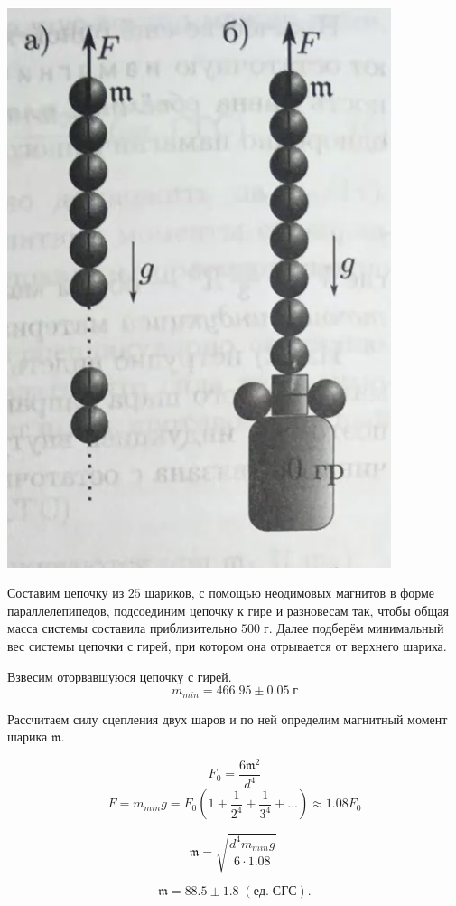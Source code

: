 \begin{center}
\begin{minipage}{0.4\textwidth}
\end{minipage}
\begin{minipage}{0.05\textwidth}
\
\end{minipage}
\begin{minipage}{0.4\textwidth}
\begin{center}
\includegraphics[width=0.7\linewidth]{2.jpg}\\
\end{center}
Составим цепочку из $25$ шариков, с помощью неодимовых магнитов в форме параллелепипедов, подсоединим цепочку к гире и разновесам так, чтобы общая масса системы составила приблизительно $500 \;г$. Далее подберём минимальный вес системы цепочки с гирей, при котором она отрывается от верхнего шарика.

Взвесим оторвавшуюся цепочку с гирей. $$m_{min} = 466.95 \pm 0.05 \; г$$

Рассчитаем силу сцепления двух шаров и по ней определим магнитный момент шарика $\mathfrak{m}$. 

\[ F_0 = \frac{6\mathfrak{m}^2}{d^4} \] \[F = m_{min}g  = F_0(1+\frac1{2^4}+\frac1{3^4} +...)\approx 1.08 F_0 \]

\[ \mathfrak{m} = \sqrt{\frac{d^4m_{min}g}{6 \cdot 1.08}} \;\]

\[\mathfrak{m} = 88.5 \pm 1.8 \; (ед. \; СГС).\]
\end{minipage}
\end{center}



